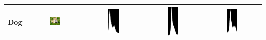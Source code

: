 \documentclass[12pt,a4paper]{article}
\begin{document}
\begin{center}
\begin{longtable}{|c|c|c|c|c|}
    \hline
    Dog & \includegraphics[width=0.2\textwidth]{./latexSource/dog_process.png} & 
           \includegraphics[width=0.2\textwidth]{./latexSource/dog_B_EQUA.png} & 
           \includegraphics[width=0.2\textwidth]{./latexSource/dog_G_EQUA.png} & 
           \includegraphics[width=0.2\textwidth]{./latexSource/dog_R_EQUA.png} \\ 
    \hline

\end{longtable}
\end{center}
\end{document}

